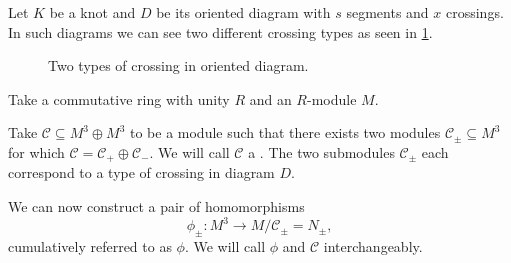 Let $K$ be a knot and $D$ be its oriented diagram with $s$ segments and $x$ crossings. In such diagrams we can see two different crossing types as seen in \cref{crossing_type}. 
\begin{figure}[h]\centering
  \caption{Two types of crossing in oriented diagram.\label{crossing_type}}
\end{figure}

Take a commutative ring with unity $R$ and an $R$-module $M$.

\begin{definition}
  Take $\mathcal{C}\subseteq M^3\oplus M^3$ to be a module such that there exists two modules $\mathcal{C}_\pm\subseteq M^3$ for which $\mathcal{C}=\mathcal{C}_+\oplus \mathcal{C}_-$. We will call $\mathcal{C}$ a . The two submodules $\mathcal{C}_\pm$ each correspond to a type of crossing in diagram $D$.
\end{definition}

We can now construct a pair of homomorphisms
$$\phi_\pm:M^3\to M/\mathcal{C}_\pm=N_\pm,$$
cumulatively referred to as $\phi$. We will call $\phi$ and $\mathcal{C}$  interchangeably.



